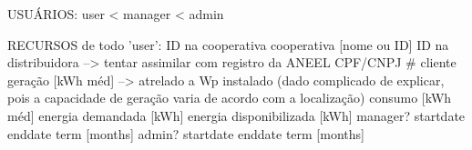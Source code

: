 
USUÁRIOS: user < manager < admin

RECURSOS de todo 'user':
	ID na cooperativa
    	cooperativa [nome ou ID]
    ID na distribuidora --> tentar assimilar com registro da ANEEL
    	CPF/CNPJ
        # cliente
    geração [kWh méd] --> atrelado a Wp instalado (dado complicado de explicar, pois a capacidade de geração varia de acordo com a localização)
    consumo [kWh méd]
    energia demandada [kWh]
    energia disponibilizada [kWh]
    manager?
    	startdate
        enddate
        term [months]
	admin?
    	startdate
        enddate
        term [months]
    
